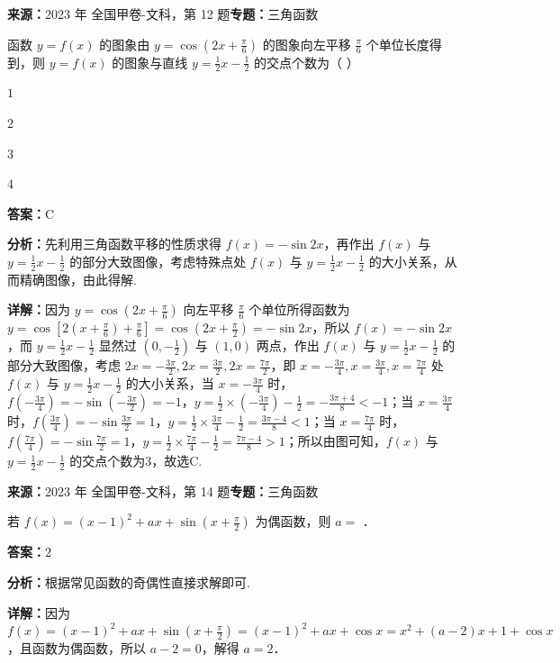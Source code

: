\begin{question}[points=5]
\textbf{来源：}2023 年 全国甲卷-文科，第 12 题\quad \textbf{专题：}三角函数\par
函数 $y=f(x)$ 的图象由 $y=\cos\left(2x+\frac{\pi}{6}\right)$ 的图象向左平移 $\frac{\pi}{6}$ 个单位长度得到，则 $y=f(x)$ 的图象与直线 $y=\frac{1}{2}x-\frac{1}{2}$ 的交点个数为（    ）
\begin{choices}
  \item $1$
  \item $2$
  \item $3$
  \item $4$
\end{choices}
\begin{solution}
\textbf{答案：}C

\textbf{分析：}先利用三角函数平移的性质求得 $f(x)=-\sin2x$，再作出 $f(x)$ 与 $y=\frac{1}{2}x-\frac{1}{2}$ 的部分大致图像，考虑特殊点处 $f(x)$ 与 $y=\frac{1}{2}x-\frac{1}{2}$ 的大小关系，从而精确图像，由此得解.

\textbf{详解：}因为 $y=\cos\left(2x+\frac{\pi}{6}\right)$ 向左平移 $\frac{\pi}{6}$ 个单位所得函数为 $y=\cos\left[2(x+\frac{\pi}{6})+\frac{\pi}{6}\right]=\cos\left(2x+\frac{\pi}{2}\right)=-\sin2x$，所以 $f(x)=-\sin2x$，而 $y=\frac{1}{2}x-\frac{1}{2}$ 显然过 $(0,-\frac{1}{2})$ 与 $(1,0)$ 两点，作出 $f(x)$ 与 $y=\frac{1}{2}x-\frac{1}{2}$ 的部分大致图像，考虑 $2x=-\frac{3\pi}{2},2x=\frac{3\pi}{2},2x=\frac{7\pi}{2}$，即 $x=-\frac{3\pi}{4},x=\frac{3\pi}{4},x=\frac{7\pi}{4}$ 处 $f(x)$ 与 $y=\frac{1}{2}x-\frac{1}{2}$ 的大小关系，当 $x=-\frac{3\pi}{4}$ 时，$f(-\frac{3\pi}{4})=-\sin(-\frac{3\pi}{2})=-1$，$y=\frac{1}{2}\times(-\frac{3\pi}{4})-\frac{1}{2}=-\frac{3\pi+4}{8}<-1$；当 $x=\frac{3\pi}{4}$ 时，$f(\frac{3\pi}{4})=-\sin\frac{3\pi}{2}=1$，$y=\frac{1}{2}\times\frac{3\pi}{4}-\frac{1}{2}=\frac{3\pi-4}{8}<1$；当 $x=\frac{7\pi}{4}$ 时，$f(\frac{7\pi}{4})=-\sin\frac{7\pi}{2}=1$，$y=\frac{1}{2}\times\frac{7\pi}{4}-\frac{1}{2}=\frac{7\pi-4}{8}>1$；所以由图可知，$f(x)$ 与 $y=\frac{1}{2}x-\frac{1}{2}$ 的交点个数为3，故选C.
\end{solution}
\end{question}

\begin{question}[points=5]
\textbf{来源：}2023 年 全国甲卷-文科，第 14 题\quad \textbf{专题：}三角函数\par
若 $f(x)=(x-1)^2+ax+\sin\left(x+\frac{\pi}{2}\right)$ 为偶函数，则 $a=$ ．
\fillin[{$2$}]
\begin{solution}
\textbf{答案：}$2$

\textbf{分析：}根据常见函数的奇偶性直接求解即可.

\textbf{详解：}因为 $f(x)=(x-1)^2+ax+\sin\left(x+\frac{\pi}{2}\right) = (x-1)^2+ax+\cos x = x^2+(a-2)x+1+\cos x$，且函数为偶函数，所以 $a-2=0$，解得 $a=2$．
\end{solution}
\end{question}

